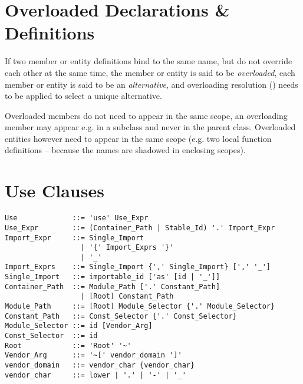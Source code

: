 \section{Overloaded Declarations \& Definitions}
\label{sec:overloaded-definitions}

If two member or entity definitions bind to the same name, but do not override each other at the same time, the member or entity is said to be {\em overloaded}, each member or entity is said to be an {\em alternative}, and overloading resolution () needs to be applied to select a unique alternative. 

Overloaded members do not need to appear in the same scope, an overloading member may appear e.g. in a subclass and never in the parent class. Overloaded entities however need to appear in the same scope (e.g. two local function definitions -- because the names are shadowed in enclosing scopes). 





\section{Use Clauses}
\label{sec:use-clauses}

\syntax\begin{lstlisting}
Use             ::= 'use' Use_Expr
Use_Expr        ::= (Container_Path | Stable_Id) '.' Import_Expr
Import_Expr     ::= Single_Import
                  | '{' Import_Exprs '}'
                  | '_'
Import_Exprs    ::= Single_Import {',' Single_Import} [',' '_']
Single_Import   ::= importable_id ['as' [id | '_']]
Container_Path  ::= Module_Path ['.' Constant_Path]
                  | [Root] Constant_Path
Module_Path     ::= [Root] Module_Selector {'.' Module_Selector}
Constant_Path   ::= Const_Selector {'.' Const_Selector}
Module_Selector ::= id [Vendor_Arg]
Const_Selector  ::= id
Root            ::= 'Root' '~'
Vendor_Arg      ::= '~[' vendor_domain ']'
vendor_domain   ::= vendor_char {vendor_char}
vendor_char     ::= lower | '.' | '-' | '_'
\end{lstlisting}

